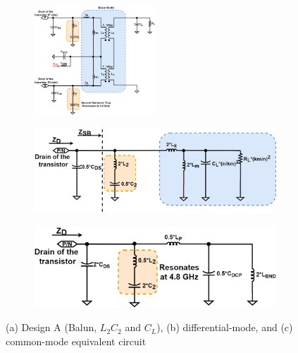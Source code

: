 \documentclass[conference]{IEEEtran}
\begin{document}
\begin{figure}[!t]
\captionsetup{font=footnotesize}
\centering
\begin{subfigure}{0.5\textwidth}
\centering
\includegraphics[width=0.5\textwidth]{Images/Design/Design_A_FC.png}
\label{fig:Design_A_FC}
\end{subfigure}
\begin{subfigure}[b]{0.24\textwidth}
\includegraphics[width=1\textwidth]{Images/Design/Design_A_Diff.png}
\label{fig:Design_A_Diff}
\end{subfigure}
\begin{subfigure}[b]{0.24\textwidth}
\includegraphics[width=1\textwidth]{Images/Design/Design_A_Com.png}
\label{fig:Design_A_Com}
\end{subfigure}
\caption{(a) Design A (Balun, $L_2C_2$ and $C_L$), (b) differential-mode, and (c) common-mode equivalent circuit }
\label{fig:Design_A}
\vspace{-0.2in}
\end{figure}
\end{document}
